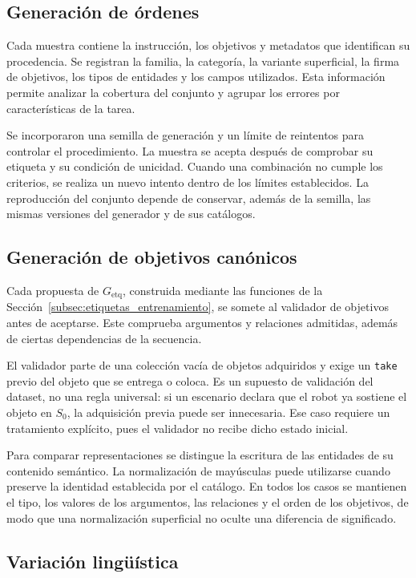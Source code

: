 \subsection{Generación de órdenes}

Cada muestra contiene la instrucción, los objetivos y metadatos que
identifican su procedencia. Se registran la familia, la categoría, la
variante superficial, la firma de objetivos, los tipos de entidades y los
campos utilizados. Esta información permite analizar la cobertura del
conjunto y agrupar los errores por características de la tarea.

Se incorporaron una semilla de generación y un límite de reintentos para
controlar el procedimiento. La muestra se acepta después de comprobar
su etiqueta y su condición de unicidad. Cuando una combinación no cumple
los criterios, se realiza un nuevo intento dentro de los límites
establecidos. La reproducción del conjunto depende de conservar, además
de la semilla, las mismas versiones del generador y de sus catálogos.

\subsection{Generación de objetivos canónicos}
\label{subsec:generacion_objetivos_cap4}

Cada propuesta de $G_{\mathrm{etq}}$, construida mediante las funciones de la Sección~\ref{subsec:etiquetas_entrenamiento}, se somete al validador de objetivos antes de aceptarse. Este comprueba argumentos y relaciones admitidas, además de ciertas dependencias de la secuencia.

El validador parte de una colección vacía de objetos adquiridos y exige un \texttt{take} previo del objeto que se entrega o coloca. Es un supuesto de validación del dataset, no una regla universal: si un escenario declara que el robot ya sostiene el objeto en $S_0$, la adquisición previa puede ser innecesaria. Ese caso requiere un tratamiento explícito, pues el validador no recibe dicho estado inicial.

Para comparar representaciones se distingue la escritura de las entidades
de su contenido semántico. La normalización de mayúsculas puede utilizarse
cuando preserve la identidad establecida por el catálogo. En todos los
casos se mantienen el tipo, los valores de los argumentos, las relaciones
y el orden de los objetivos, de modo que una normalización superficial
no oculte una diferencia de significado.


\subsection{Variación lingüística}

